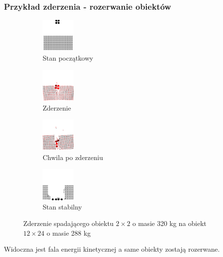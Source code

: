 \documentclass{beamer}
\begin{document}
\begin{frame}
    \frametitle{Przykład zderzenia - rozerwanie obiektów}
    \begin{figure}[h]

        \begin{subfigure}{0.4\textwidth}
            \centering
            \includegraphics[width=1.7cm, height=1.7cm]{collision_2x2_24x12_mass80_1}
            \caption{Stan początkowy}
        \end{subfigure}
        \begin{subfigure}{0.4\textwidth}
            \centering
            \includegraphics[width=1.7cm, height=1.7cm]{collision_2x2_24x12_mass80_2}
            \caption{Zderzenie}
        \end{subfigure}
        \begin{subfigure}{0.4\textwidth}
            \centering
            \includegraphics[width=1.7cm, height=1.7cm]{collision_2x2_24x12_mass80_3}
            \caption{Chwila po zderzeniu}
        \end{subfigure}
        \begin{subfigure}{0.4\textwidth}
            \centering
            \includegraphics[width=1.7cm, height=1.7cm]{collision_2x2_24x12_mass80_4}
            \caption{Stan stabilny}
        \end{subfigure}

        \caption{Zderzenie spadającego obiektu $2 \times 2$ o masie 320 kg na obiekt $12 \times 24$ o masie 288 kg}
    \end{figure}

    Widoczna jest fala energii kinetycznej a same obiekty zostają rozerwane.
\end{frame}
\end{document}
